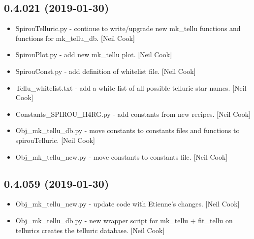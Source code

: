 \documentclass[a4paper,10pt,english]{report}
\begin{document}
\subsection{0.4.021 (2019-01-30)}
\label{\detokenize{misc/changelog:id200}}\begin{itemize}
\item {} 
SpirouTelluric.py - continue to write/upgrade new mk\_tellu functions
and functions for mk\_tellu\_db. {[}Neil Cook{]}

\item {} 
SpirouPlot.py - add new mk\_tellu plot. {[}Neil Cook{]}

\item {} 
SpirouConst.py - add definition of whitelist file. {[}Neil Cook{]}

\item {} 
Tellu\_whitelist.txt - add a white list of all possible telluric star
names. {[}Neil Cook{]}

\item {} 
Constants\_SPIROU\_H4RG.py - add constants from new recipes. {[}Neil Cook{]}

\item {} 
Obj\_mk\_tellu\_db.py - move constants to constants files and functions
to spirouTelluric. {[}Neil Cook{]}

\item {} 
Obj\_mk\_tellu\_new.py - move constants to constants file. {[}Neil Cook{]}

\end{itemize}


\subsection{0.4.059 (2019-01-30)}
\label{\detokenize{misc/changelog:id201}}\begin{itemize}
\item {} 
Obj\_mk\_tellu\_new.py - update code with Etienne’s changes. {[}Neil Cook{]}

\item {} 
Obj\_mk\_tellu\_db.py - new wrapper script for mk\_tellu + fit\_tellu on
tellurics \textendash{} creates the telluric database. {[}Neil Cook{]}

\end{itemize}
\end{document}
